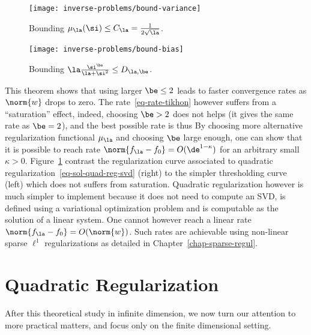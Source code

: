 \begin{figure}
\centering
\texttt{[image: inverse-problems/bound-variance]} 
\caption{\label{fig-bound-regul-variance}
Bounding $\mu_{\la}(\si) \leq C_\la = \frac{1}{2\sqrt{\la}}$.
}
\end{figure}


\begin{figure}
\centering
\texttt{[image: inverse-problems/bound-bias]} \quad
\caption{\label{fig-bound-regul}
Bounding $\la \frac{\si^\be}{\la+\si^2} \leq D_{\la,\be}$. 
}
\end{figure}



This theorem shows that using larger $\be \leq 2$ leads to faster convergence rates as $\norm{w}$ drops to zero.
The rate~\eqref{eq-rate-tikhon} however suffers from a ``saturation'' effect, indeed, choosing $\be > 2$ does not helps (it gives the same rate as $\be=2$), and the best possible rate is thus 
By choosing more alternative regularization functional $\mu_\la$ and choosing $\be$ large enough, one can show that it is possible to reach rate $\norm{f_\la - f_0} = O( \de^{1-\kappa} )$ for an arbitrary small $\kappa>0$.
%
Figure~\ref{fig-bound-regul-variance} contrast the regularization curve associated to quadratic regularization~\eqref{eq-sol-quad-reg-svd} (right) to the simpler thresholding curve (left) which does not suffers from saturation. Quadratic regularization however is much simpler to implement because it does not need to compute an SVD, is defined using a variational optimization problem and is computable as the solution of a linear system. 
%
One cannot however reach a linear rate $\norm{f_\la - f_0}=O(\norm{w})$. Such rates are achievable using non-linear sparse $\ell^1$ regularizations as detailed in Chapter~\ref{chap-sparse-regul}. 

\section{Quadratic Regularization}

After this theoretical study in infinite dimension, we now turn our attention to more practical matters, and focus only on the finite dimensional setting.


